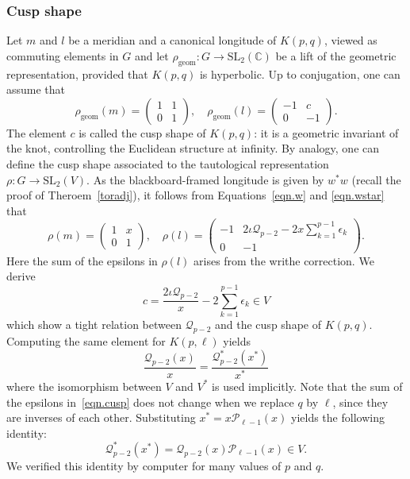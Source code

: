 \documentclass{amsart}
\newcommand{\C}{\mathbb{C}}
\newcommand{\SL}{\mathrm{SL}}
\def\calP{\mathcal{P}}
\def\calQ{\mathcal{Q}}
\theoremstyle{definition}
\newtheorem{Remark}[Theorem]{Remark}
\begin{document}


\subsubsection{Cusp shape}
Let $m$ and $l$ be a meridian and a canonical longitude of $K(p,q)$, viewed as commuting elements in $G$ and let $\rho_{\text{geom}}:G\to \SL_2(\C)$ be a lift of the geometric representation, provided that $K(p,q)$ is hyperbolic. Up to conjugation, one can assume that 
$$\rho_{\text{geom}}(m)=\begin{pmatrix} 1 & 1 \\ 0 & 1 \end{pmatrix},\quad \rho_{\text{geom}}(l)=\begin{pmatrix} -1 & c \\ 0 & -1 \end{pmatrix}.$$
The element $c$ is called the cusp shape of $K(p,q)$: it is a geometric invariant of the knot, controlling the Euclidean structure at infinity.
By analogy, one can define the cusp shape associated to the tautological representation $\rho:G\to \SL_2(V)$. 
As the blackboard-framed longitude is given by $w^\ast w$ (recall the proof of Theroem~\ref{toradj}), it follows from Equations~\eqref{eqn.w} and \eqref{eqn.wstar} that
$$\rho(m)=\begin{pmatrix} 1 & x \\ 0 & 1\end{pmatrix},\quad \rho(l)=\begin{pmatrix}-1 & 2\iota \calQ_{p-2} - 2x \sum_{k=1}^{p-1} \epsilon_k\\ 0 & -1\end{pmatrix}.$$
Here the sum of the epsilons in $\rho(l)$ arises from the writhe correction.
We derive 
\begin{equation}
\label{eqn.cusp}
   c=\frac{2 \iota \calQ_{p-2}}{x} -2 \sum_{k=1}^{p-1} \epsilon_k \in V
\end{equation} which show a tight relation between $\calQ_{p-2}$ and the cusp shape of $K(p,q)$. Computing the same element for $K(p,\ell)$ yields 
$$\frac{\calQ_{p-2}(x)}{x}=\frac{\calQ^\ast_{p-2}(x^\ast)}{x^\ast}$$
where the isomorphism between $V$ and $V^\ast$ is used implicitly.
Note that the sum of the epsilons in~\eqref{eqn.cusp} does not change when we replace $q$ by $\ell$, since they are inverses of each other.
Substituting $x^\ast=x\calP_{\ell-1}(x)$ yields the following identity:
$$\calQ^\ast_{p-2}(x^\ast)=\calQ_{p-2}(x)\calP_{\ell-1}(x)\in V.$$
We verified this identity by computer for many values of $p$ and $q$.
\end{document}
